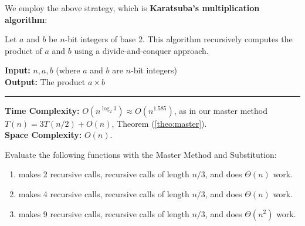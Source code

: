 \noindent
We employ the above strategy, which is \textbf{Karatsuba's multiplication algorithm}:

\begin{Func}
    Let $a$ and $b$ be $n$-bit integers of base 2. This algorithm recursively computes the product of $a$ and $b$ using a divide-and-conquer approach.

    \vspace{.5em}
    \noindent
    \textbf{Input:} $n, a, b$ (where $a$ and $b$ are $n$-bit integers)\\
    \textbf{Output:} The product $a \times b$\\

    \begin{algorithm}[H]
        \SetAlgoLined
    \end{algorithm}
    \noindent\rule{\textwidth}{0.4pt}

    \noindent
    \textbf{Time Complexity:} $O(n^{\log_2 3}) \approx O(n^{1.585})$, as in our master method $T(n)=3T(n/2)+O(n)$, Theorem (\ref{theo:master}).\\
    \textbf{Space Complexity:} $O(n)$.
\end{Func}

\newpage 

\begin{Exercise} Evaluate the following functions with the Master Method and Substitution:
    \begin{enumerate}
        \item makes 2 recursive calls, recursive calls of length $n/3$, and does $\Theta(n)$ work.
        \item makes 4 recursive calls, recursive calls of length $n/3$, and does $\Theta(n)$ work.
        \item makes 9 recursive calls, recursive calls of length $n/3$, and does $\Theta(n^2)$ work.
    \end{enumerate}
\end{Exercise}

